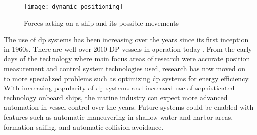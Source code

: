 \begin{figure}
	\centering
	\texttt{[image: dynamic-positioning]}
	\caption{Forces acting on a ship and its possible movements}
	\label{fig:shipforces}
\end{figure}

The use of dp systems has been increasing over the years since its first inception in 1960s. There are well over 2000 DP vessels in operation today \citep{sorensen2011survey}. From the early days of the technology where main focus areas of research were accurate position measurement and control system technologies used, research has now moved on to more specialized problems such as optimizing dp systems for energy efficiency. With increasing popularity of dp systems and increased use of sophisticated technology onboard ships, the marine industry can expect more advanced automation in vessel control over the years. Future systems could be enabled with features such as automatic maneuvering in shallow water and harbor areas, formation sailing, and automatic collision avoidance.







